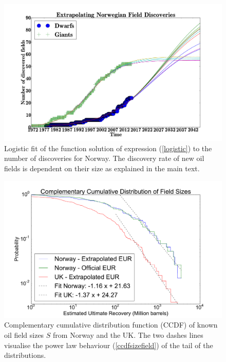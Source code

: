 \documentclass[review]{elsarticle}
\begin{document}
\begin{figure}[H]
\includegraphics[width=1\columnwidth]{extrapolating-no-discoveries}
\caption{\doublespacing
Logistic fit of the function solution of expression (\ref{logistic})
to the number of discoveries for Norway. The discovery
rate of new oil fields is dependent on their size as explained in the main text.}
\label{rate_of_discovery} 
\end{figure}

\pagebreak

\begin{figure}[H]
\includegraphics[width=1\columnwidth]{ccdf-field-size}
\caption{\doublespacing
Complementary cumulative distribution function (CCDF) of known oil field sizes $S$ from Norway and the UK.
The two dashes lines visualise the power law behaviour (\ref{ccdfsizefield}) of the tail
of the distributions. }
\label{ccdffieldsizes}
\end{figure}
\end{document}
